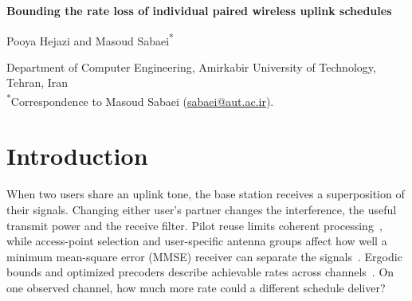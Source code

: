 \documentclass[11pt,letterpaper]{article}
\begin{document}
\begin{center}
{\LARGE\bfseries Bounding the rate loss of individual paired wireless uplink schedules\par}
\vspace{0.65em}
{\large Pooya Hejazi and Masoud Sabaei\textsuperscript{*}\par}
\vspace{0.3em}
Department of Computer Engineering, Amirkabir University of Technology, Tehran, Iran\\
\textsuperscript{*}Correspondence to Masoud Sabaei (\href{mailto:sabaei@aut.ac.ir}{sabaei@aut.ac.ir}).
\end{center}

\begin{abstract}
How much could a base station gain by changing the users and powers it assigns to its uplink tones? We bound that gain for an individual schedule in which two users share each tone and the receiver applies a separate linear filter to each. We bound pair rates over continuous powers and combine them using a verifiable matching certificate. A four-user example shows that even optimal tone prices can leave a gap. Across 512 simulated topologies per size, deterministic search gave median loss bounds of 0.061 and 0.067 bit/s/Hz at 32 and 64 users, with median computation times of 18 and 80 ms. In a retrospective comparison, the tightest of seven ceilings certified 395 and 426 unchanged zero-price schedules within 0.15 bit/s/Hz of optimality. On two array recordings, projected floors reached 24--28\% of later-pilot rates in median paired comparisons. A separate receiver decoded the simultaneous six-user transmissions with uncoded bit error rates of 0.0593\% and 37.13\% in the shared-clock and local-clock recordings. These recordings contained one acquisition per mode and no packet outcomes for the proposed pairs.
\end{abstract}

\section*{Introduction}
When two users share an uplink tone, the base station receives a superposition of their signals. Changing either user's partner changes the interference, the useful transmit power and the receive filter. Pilot reuse limits coherent processing~\cite{marzetta}, while access-point selection and user-specific antenna groups affect how well a minimum mean-square error (MMSE) receiver can separate the signals~\cite{ngo,bjornson,demir,buzzi}. Ergodic bounds and optimized precoders describe achievable rates across channels~\cite{caire,wang}. On one observed channel, how much more rate could a different schedule deliver?
\end{document}
